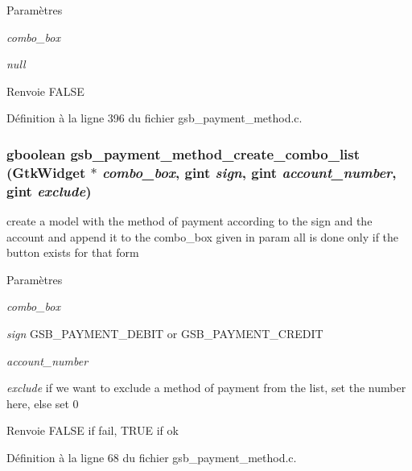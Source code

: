 \begin{DoxyParams}{Paramètres}
\item[{\em combo\_\-box}]\item[{\em null}]\end{DoxyParams}
\begin{DoxyReturn}{Renvoie}
FALSE 
\end{DoxyReturn}


Définition à la ligne 396 du fichier gsb\_\-payment\_\-method.c.

\subsubsection[{gsb\_\-payment\_\-method\_\-create\_\-combo\_\-list}]{\setlength{\rightskip}{0pt plus 5cm}gboolean gsb\_\-payment\_\-method\_\-create\_\-combo\_\-list (GtkWidget $\ast$ {\em combo\_\-box}, \/  gint {\em sign}, \/  gint {\em account\_\-number}, \/  gint {\em exclude})}\label{gsb__payment__method_8h_a161fa2bfbb02f3b3310759b78437586a}
create a model with the method of payment according to the sign and the account and append it to the combo\_\-box given in param all is done only if the button exists for that form


\begin{DoxyParams}{Paramètres}
\item[{\em combo\_\-box}]\item[{\em sign}]GSB\_\-PAYMENT\_\-DEBIT or GSB\_\-PAYMENT\_\-CREDIT \item[{\em account\_\-number}]\item[{\em exclude}]if we want to exclude a method of payment from the list, set the number here, else set 0\end{DoxyParams}
\begin{DoxyReturn}{Renvoie}
FALSE if fail, TRUE if ok 
\end{DoxyReturn}


Définition à la ligne 68 du fichier gsb\_\-payment\_\-method.c.

